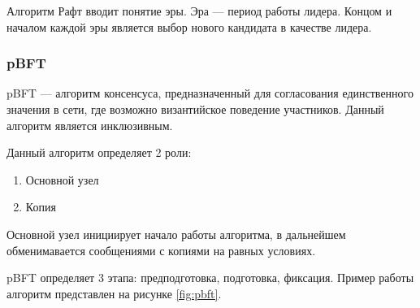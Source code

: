                 Алгоритм Рафт вводит понятие эры. Эра --- период работы лидера. Концом и началом каждой эры является выбор нового кандидата в качестве лидера.

            \subsubsection{pBFT}

                pBFT\cite{castro1999practical} --- алгоритм консенсуса, предназначенный для согласования единственного значения в сети, где возможно византийское поведение участников. Данный алгоритм является инклюзивным.
                
                Данный алгоритм определяет 2 роли:
                
                \begin{enumerate}
                    \item Основной узел
                    \item Копия
                \end{enumerate}
                
                Основной узел инициирует начало работы алгоритма, в дальнейшем обменимавается сообщениями с копиями на равных условиях.
                
                pBFT определяет 3 этапа: предподготовка, подготовка, фиксация. Пример работы алгоритм представлен на рисунке \ref{fig:pbft}.
                
